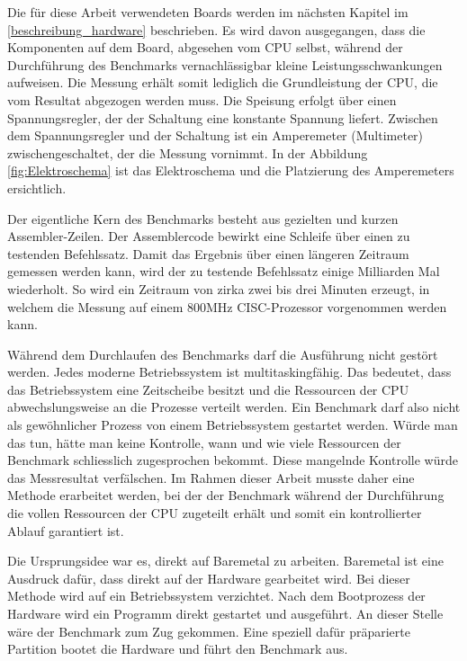 Die für diese Arbeit verwendeten Boards werden im nächsten Kapitel im \autoref{beschreibung_hardware} beschrieben. Es wird davon ausgegangen, dass die Komponenten auf dem Board, abgesehen vom CPU selbst, während der Durchführung des Benchmarks vernachlässigbar kleine Leistungsschwankungen aufweisen. Die Messung erhält somit lediglich die Grundleistung der CPU, die vom Resultat abgezogen werden muss. Die Speisung erfolgt über einen Spannungsregler, der der Schaltung eine konstante Spannung liefert. Zwischen dem Spannungsregler und der Schaltung ist ein Amperemeter (Multimeter) zwischengeschaltet, der die Messung vornimmt. In der Abbildung \ref{fig:Elektroschema} ist das Elektroschema und die Platzierung des Amperemeters ersichtlich.
\par
Der eigentliche Kern des Benchmarks besteht aus gezielten und kurzen Assembler-Zeilen. Der Assemblercode bewirkt eine Schleife über einen zu testenden Befehlssatz. Damit das Ergebnis über einen längeren Zeitraum gemessen werden kann, wird der zu testende Befehlssatz einige Milliarden Mal  wiederholt. So wird ein Zeitraum von zirka zwei bis drei Minuten erzeugt, in welchem die Messung auf einem 800MHz CISC-Prozessor vorgenommen werden kann.
\par
Während dem Durchlaufen des Benchmarks darf die Ausführung nicht gestört werden. Jedes moderne Betriebssystem ist multitaskingfähig. Das bedeutet, dass das Betriebssystem eine Zeitscheibe besitzt und die Ressourcen der CPU abwechslungsweise an die Prozesse verteilt werden. Ein Benchmark darf also nicht als gewöhnlicher Prozess von einem Betriebssystem gestartet werden. Würde man das tun, hätte man keine Kontrolle, wann und wie viele Ressourcen der Benchmark schliesslich zugesprochen bekommt. Diese mangelnde Kontrolle würde das Messresultat verfälschen. Im Rahmen dieser Arbeit musste daher eine Methode erarbeitet werden, bei der der Benchmark während der Durchführung die vollen Ressourcen der CPU zugeteilt erhält und somit ein kontrollierter Ablauf garantiert ist.
\par
Die Ursprungsidee war es, direkt auf Baremetal zu arbeiten. Baremetal ist eine Ausdruck dafür, dass direkt auf der Hardware gearbeitet wird. Bei dieser Methode wird auf ein Betriebssystem verzichtet. Nach dem Bootprozess der Hardware wird ein Programm direkt gestartet und ausgeführt. An dieser Stelle wäre der Benchmark zum Zug gekommen. Eine speziell dafür präparierte Partition bootet die Hardware und führt den Benchmark aus.
\par
